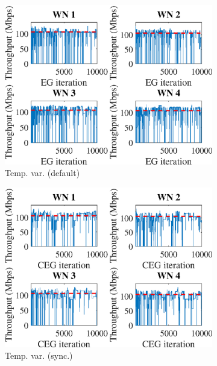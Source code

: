 \documentclass[preprint,12pt]{article}
\begin{document}
\begin{figure}[h!]
\begin{subfigure}[b]{.3\textwidth}
		\includegraphics[width=\textwidth]{images/temporal_individual_tpt_EG}
		\caption{Temp. var.  (default)}\label{fig:temporal_individual_tpt_EG}
	\end{subfigure}
	\begin{subfigure}[b]{.3\textwidth}
		\includegraphics[width=\textwidth]{images/temporal_individual_tpt_CEG}
		\caption{Temp. var.  (sync.)}\label{fig:temporal_individual_tpt_CEG}
	\end{subfigure}\\
	\begin{subfigure}[b]{.3\textwidth}

\end{subfigure}
\end{figure}
\end{document}
